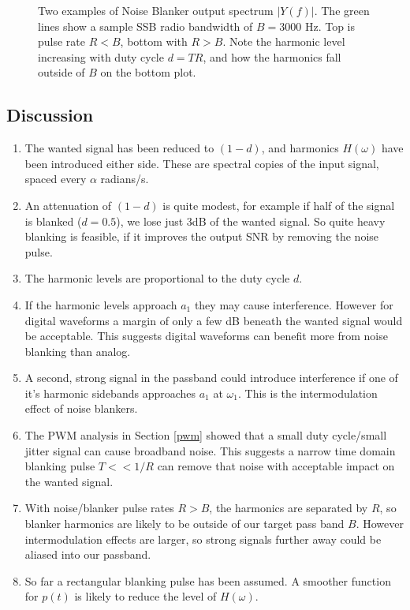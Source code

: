 \documentclass{article}
\begin{document}
\begin{figure}[h]
\caption{Two examples of Noise Blanker output spectrum $|Y(f)|$.  The green lines show a sample SSB radio bandwidth of $B=3000$ Hz. Top is pulse rate $R<B$, bottom with $R>B$.  Note the harmonic level increasing with duty cycle $d=TR$, and how the harmonics fall outside of $B$ on the bottom plot. }
\label{fig:blanker}
\begin{center}

\end{center}
\end{figure}

\subsection{Discussion}

\begin{enumerate}
\item The wanted signal has been reduced to $(1-d)$, and harmonics $H(\omega)$ have been introduced either side.  These are spectral copies of the input signal, spaced every $\alpha$ radians/s.
\item An attenuation of $(1-d)$ is quite modest, for example if half of the signal is blanked ($d=0.5$), we lose just 3dB of the wanted signal.  So quite heavy blanking is feasible, if it improves the output SNR by removing the noise pulse.
\item The harmonic levels are proportional to the duty cycle $d$.
\item If the harmonic levels approach $a_1$ they may cause interference.  However for digital waveforms a margin of only a few dB beneath the wanted signal would be acceptable.  This suggests digital waveforms can benefit more from noise blanking than analog. 
\item A second, strong signal in the passband could introduce interference if one of it's harmonic sidebands approaches $a_1$ at $\omega_1$.  This is the intermodulation effect of noise blankers.
\item The PWM analysis in Section \ref{pwm} showed that a small duty cycle/small jitter signal can cause broadband noise.  This suggests a narrow time domain blanking pulse $T<<1/R$ can remove that noise with acceptable impact on the wanted signal. 
\item With noise/blanker pulse rates $R>B$, the harmonics are separated by $R$, so blanker harmonics are likely to be outside of our target pass band $B$.  However intermodulation effects are larger, so strong signals further away could be aliased into our passband. 
\item So far a rectangular blanking pulse has been assumed. A smoother function for $p(t)$ is likely to reduce the level of $H(\omega)$. 
\end{enumerate}
\end{document}

